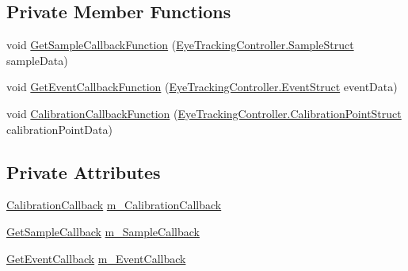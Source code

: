 \subsection*{Private Member Functions}
\begin{DoxyCompactItemize}
\item 
void \hyperlink{class_web_analyzer_1_1_eye_tracking_1_1_eye_tracking_model_a88d3a53476fe1dc652fbbb7ce8b30fdd}{Get\+Sample\+Callback\+Function} (\hyperlink{struct_web_analyzer_1_1_eye_tracking_1_1_eye_tracking_controller_1_1_sample_struct}{Eye\+Tracking\+Controller.\+Sample\+Struct} sample\+Data)
\item 
void \hyperlink{class_web_analyzer_1_1_eye_tracking_1_1_eye_tracking_model_a01a7efee3ea0a2a06c1c7405d8fb9598}{Get\+Event\+Callback\+Function} (\hyperlink{struct_web_analyzer_1_1_eye_tracking_1_1_eye_tracking_controller_1_1_event_struct}{Eye\+Tracking\+Controller.\+Event\+Struct} event\+Data)
\item 
void \hyperlink{class_web_analyzer_1_1_eye_tracking_1_1_eye_tracking_model_a64c9fd68eba26c6731242d9bf3c07a53}{Calibration\+Callback\+Function} (\hyperlink{struct_web_analyzer_1_1_eye_tracking_1_1_eye_tracking_controller_1_1_calibration_point_struct}{Eye\+Tracking\+Controller.\+Calibration\+Point\+Struct} calibration\+Point\+Data)
\end{DoxyCompactItemize}
\subsection*{Private Attributes}
\begin{DoxyCompactItemize}
\item 
\hyperlink{class_web_analyzer_1_1_eye_tracking_1_1_eye_tracking_model_ad6c2f20511c53eaf55a8fb18d263b51c}{Calibration\+Callback} \hyperlink{class_web_analyzer_1_1_eye_tracking_1_1_eye_tracking_model_ac209f94d8baa0d71cb3df9c7a4233c1f}{m\+\_\+\+Calibration\+Callback}
\item 
\hyperlink{class_web_analyzer_1_1_eye_tracking_1_1_eye_tracking_model_afa0ffe40b73c90761f49dec896df4baa}{Get\+Sample\+Callback} \hyperlink{class_web_analyzer_1_1_eye_tracking_1_1_eye_tracking_model_a968cb8269069b117054c23c913671380}{m\+\_\+\+Sample\+Callback}
\item 
\hyperlink{class_web_analyzer_1_1_eye_tracking_1_1_eye_tracking_model_a40785479d78104c591e53c7e2847e9ff}{Get\+Event\+Callback} \hyperlink{class_web_analyzer_1_1_eye_tracking_1_1_eye_tracking_model_a806e6c2c97d1e27187755e8d22f87d86}{m\+\_\+\+Event\+Callback}
\end{DoxyCompactItemize}


